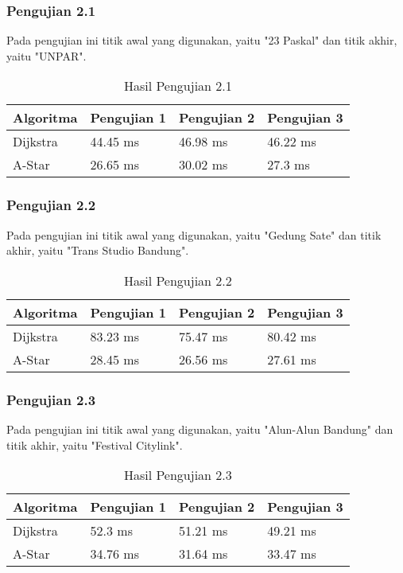 \subsubsection{Pengujian 2.1}
Pada pengujian ini titik awal yang digunakan, yaitu "23 Paskal" dan titik akhir, yaitu "UNPAR".

\begin{table}[H]
\centering
\caption{Hasil Pengujian 2.1}
\label{tab:hasiluji2.1}
{\large
\begin{tabular}{|l|l|l|l|}
\hline
\textbf{Algoritma} & \textbf{Pengujian 1} & \textbf{Pengujian 2} & \textbf{Pengujian 3} \\ \hline
Dijkstra           & 44.45 ms              & 46.98 ms             & 46.22 ms              \\ \hline
A-Star            & 26.65 ms              & 30.02 ms              & 27.3 ms              \\ \hline
\end{tabular}
}
\end{table}

\subsubsection{Pengujian 2.2}
Pada pengujian ini titik awal yang digunakan, yaitu "Gedung Sate" dan titik akhir, yaitu "Trans Studio Bandung".

\begin{table}[H]
\centering
\caption{Hasil Pengujian 2.2}
\label{tab:hasiluji2.2}
{\large
\begin{tabular}{|l|l|l|l|}
\hline
\textbf{Algoritma} & \textbf{Pengujian 1} & \textbf{Pengujian 2} & \textbf{Pengujian 3} \\ \hline
Dijkstra           & 83.23 ms              & 75.47 ms             & 80.42 ms              \\ \hline
A-Star            & 28.45 ms              & 26.56 ms              & 27.61 ms              \\ \hline
\end{tabular}
}
\end{table}

\subsubsection{Pengujian 2.3}
Pada pengujian ini titik awal yang digunakan, yaitu "Alun-Alun Bandung" dan titik akhir, yaitu "Festival Citylink".

\begin{table}[H]
\centering
\caption{Hasil Pengujian 2.3}
\label{tab:hasiluji2.3}
{\large
\begin{tabular}{|l|l|l|l|}
\hline
\textbf{Algoritma} & \textbf{Pengujian 1} & \textbf{Pengujian 2} & \textbf{Pengujian 3} \\ \hline
Dijkstra           & 52.3 ms              & 51.21 ms             & 49.21 ms              \\ \hline
A-Star            & 34.76 ms              & 31.64 ms              & 33.47 ms              \\ \hline
\end{tabular}
}
\end{table}

